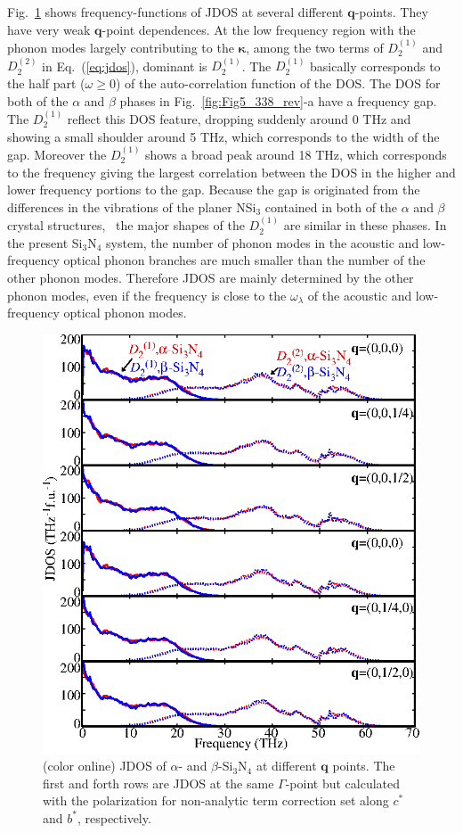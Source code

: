 \documentclass[twocolumn,amsmath,amssymb,a4paper,prb,superscriptaddress,floatfix]{revtex4-1}
\begin{document}
Fig.~\ref{fig:Fig6_338} shows frequency-functions of JDOS at several different
$\mathbf{q}$-points. They have very weak
$\mathbf{q}$-point dependences. At the low frequency region with the phonon modes
largely contributing to the $\boldsymbol{\kappa}$, among the two terms of
$D_2^{(1)}$ and $D_2^{(2)}$ in Eq.~(\ref{eq:jdos}), dominant is $D_2^{(1)}$.
The $D_2^{(1)}$ basically corresponds to the half part ($\omega \geq  0$) of the
auto-correlation function of the DOS. The DOS for both of the $\alpha$ and
$\beta$ phases in Fig.~\ref{fig:Fig5_338_rev}-a have a frequency gap. The
$D_2^{(1)}$ reflect this DOS feature, dropping suddenly around 0 THz and showing
a small shoulder around 5 THz, which corresponds to the width of the gap.
Moreover the $D_2^{(1)}$ shows a broad peak around 18 THz, which corresponds to
the frequency giving the largest correlation between the DOS in the
higher and lower frequency portions to the gap.  Because the gap is originated
from the differences in the vibrations of the planer NSi$_3$ contained in both
of the $\alpha$ and $\beta$ crystal structures,~\cite{kuwabara} the major shapes
of the $D_2^{(1)}$ are similar in these phases.
In the present Si$_3$N$_4$ system, the number of phonon modes in the acoustic
and low-frequency optical phonon branches are much smaller than 
the number of the other phonon modes. 
Therefore JDOS are mainly determined by the other phonon modes, even if the
frequency is close to the $\omega_\lambda$ of the acoustic and low-frequency
optical phonon modes.

\begin{figure}[ht]
 \centering
  \includegraphics[width=0.9\linewidth]{figure_jdoss.eps} \caption{(color
	  online) JDOS of $\alpha$- and $\beta$-Si$_3$N$_4$ at different $\mathbf q$ points.
  The first and forth rows are JDOS at the same $\Gamma$-point but calculated
  with the polarization for non-analytic term correction set along $c^*$ and
  $b^*$, respectively. \label{fig:Fig6_338} }
 \centering
\end{figure}
\end{document}

